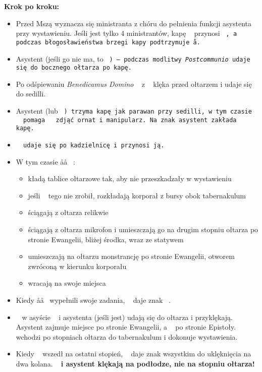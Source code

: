 \textbf{Krok po kroku:}
\begin{itemize}
	\item Przed Mszą wyznacza się ministranta z chóru do pełnienia funkcji
	      asystenta przy wystawieniu. Jeśli jest tylko 4 ministrantów, kapę \ii~
	      przynosi \tt~, a podczas błogosławieństwa brzegi kapy podtrzymuje \aa.
	\item Asystent (jeśli go nie ma, to \tt~) – podczas modlitwy
	      \textit{Postcommunio} udaje się do bocznego ołtarza po kapę.
	\item Po odśpiewaniu \textit{Benedicamus Domino} \ii~ z \cc~ klęka przed
	      ołtarzem i udaje się do sedilli.
	\item Asystent (lub \tt~) trzyma kapę jak parawan przy sedilli, w tym czasie
	      \cc~ pomaga \ii~ zdjąć ornat i manipularz. Na znak \cc asystent
	      zakłada \ii~ kapę.
	\item \tt~ udaje się po kadzielnicę i przynosi ją.
	\item W tym czasie \aa\aa~ :
	      \begin{itemize}
		      \item kładą tablice ołtarzowe tak, aby nie przeszkadzały w
		            wystawieniu
		      \item jeśli \ii~ tego nie zrobił, rozkładają korporał z bursy obok
		            tabernakulum
		      \item ściągają z ołtarza relikwie
		      \item ściągają z ołtarza mikrofon i umieszczają go na drugim
		            stopniu ołtarza po stronie Ewangelii, bliżej środka, wraz ze
		            statywem
		      \item umieszczają na ołtarzu monstrancję po stronie Ewangelii,
		            otworem zwróconą w kierunku korporału
		      \item wracają na swoje miejsca
	      \end{itemize}
	\item Kiedy \aa\aa~ wypełnili swoje zadania, \cc~ daje znak \ii~.
	\item \ii~ w asyście \cc~ i asystenta (jeśli jest) udają się do ołtarza i
	      przyklękają. Asystent zajmuje miejsce po stronie Ewangelii, a \cc~ po
	      stronie Epistoły. \ii~ wchodzi po stopniach ołtarza do tabernakulum i
	      dokonuje wystawienia.
	\item Kiedy \ii~ wszedł na ostatni stopień, \cc~ daje znak wszystkim do
	      uklęknięcia na dwa kolana. {\boldmath{\cc}}~\textbf{ i asystent
		      klękają na podłodze, nie na stopniu ołtarza!}

\end{itemize}
